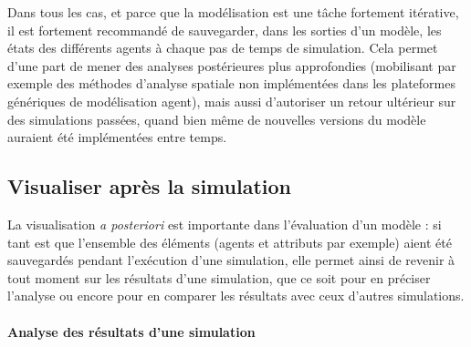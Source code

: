 \documentclass[a4paper, 12pt]{article}
\begin{document}
\bigskip

Dans tous les cas, et parce que la modélisation est une tâche fortement itérative, il est fortement recommandé de sauvegarder, dans les sorties d'un modèle, les états des différents agents à chaque pas de temps de simulation.
Cela permet d'une part de mener des analyses postérieures plus approfondies (mobilisant par exemple des méthodes d'analyse spatiale non implémentées dans les plateformes génériques de modélisation agent), mais aussi d'autoriser un retour ultérieur sur des simulations passées, quand bien même de nouvelles versions du modèle auraient été implémentées entre temps.

\subsection{Visualiser après la simulation \label{subsec:visualiser-apres}}

La visualisation \textit{a posteriori} est importante dans l'évaluation d'un modèle : 
si tant est que l'ensemble des éléments (agents et attributs par exemple) aient été sauvegardés pendant l'exécution d'une simulation, elle permet ainsi de revenir à tout moment sur les résultats d'une simulation, que ce soit pour en préciser l'analyse ou encore pour en comparer les résultats avec ceux d'autres simulations.

\paragraph{Analyse des résultats d'une simulation}
\end{document}
